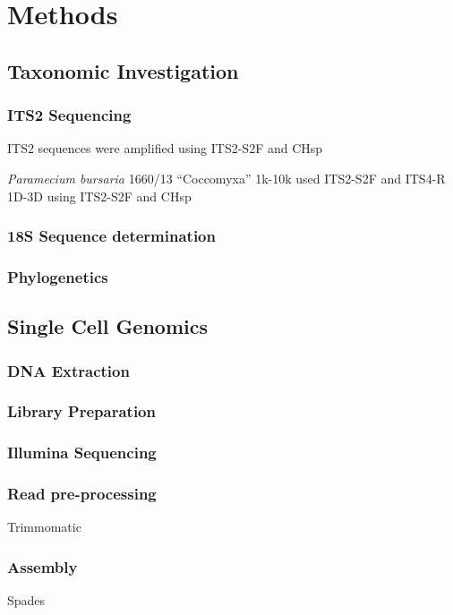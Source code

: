 \section{Methods}

\subsection{Taxonomic Investigation}
    
\subsubsection{ITS2 Sequencing}

ITS2 sequences were amplified using ITS2-S2F and CHsp 


\textit{Paramecium bursaria} 1660/13 ``Coccomyxa'' 
1k-10k used ITS2-S2F and ITS4-R
1D-3D using ITS2-S2F and CHsp


\subsubsection{18S Sequence determination}

\subsubsection{Phylogenetics}

\subsection{Single Cell Genomics}

\subsubsection{DNA Extraction}

\subsubsection{Library Preparation}

\subsubsection{Illumina Sequencing}

\subsubsection{Read pre-processing}
Trimmomatic
\subsubsection{Assembly}
Spades
